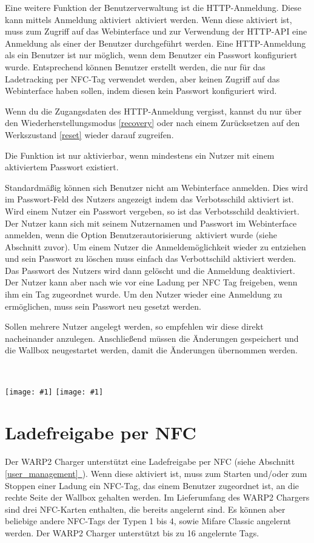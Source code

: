 \documentclass[a4paper,10pt]{article}
\newcommand{\hint}[1]{\begin{tcolorbox}[colback=boxgray,colframe=black,coltext=
white,title=Hinweis,left*=2mm,right*=2mm,boxsep=1mm,bottom=1mm,top=1mm]#1\end{tcolorbox}}
\newcommand{\gfx}[1]{\texttt{[image: \#1]}}
\newcommand*{\fullref}[1]{\hyperref[{#1}]{\ref*{#1}~\nameref*{#1}}}
\begin{document}
\begin{multicols*}{2}
	Eine weitere Funktion der Benutzerverwaltung ist die HTTP-Anmeldung. Diese
	kann mittels \glqq Anmeldung aktiviert\grqq~aktiviert werden. Wenn diese aktiviert ist, muss zum Zugriff auf das Webinterface und zur Verwendung
	der HTTP-API eine Anmeldung als einer der Benutzer durchgeführt werden. Eine HTTP-Anmeldung als ein Benutzer ist nur möglich, wenn
	dem Benutzer ein Passwort konfiguriert wurde. Entsprechend können Benutzer erstellt werden, die nur für das Ladetracking per NFC-Tag
	verwendet werden, aber keinen Zugriff auf das Webinterface haben sollen, indem diesen kein Passwort konfiguriert wird.
	\hint{Wenn du die Zugangsdaten des HTTP-Anmeldung vergisst, kannst du nur über den Wiederherstellungsmodus \ref{recovery} oder nach einem Zurücksetzen auf den Werkszustand \ref{reset} wieder darauf zugreifen.}
	Die Funktion ist nur aktivierbar, wenn mindestens ein Nutzer mit einem
	aktiviertem Passwort existiert.

	Standardmäßig können sich Benutzer nicht am Webinterface anmelden. Dies wird
	im Passwort-Feld des Nutzers angezeigt indem das Verbotsschild aktiviert
	ist. Wird einem Nutzer ein Passwort vergeben, so ist das Verbotsschild
	deaktiviert. Der Nutzer kann sich mit seinem Nutzernamen und Passwort im
	Webinterface anmelden, wenn die Option \glqq
	Benutzerautorisierung\grqq~aktiviert wurde (siehe Abschnitt zuvor).
	Um einem Nutzer die Anmeldemöglichkeit wieder zu entziehen und sein Passwort
	zu löschen muss einfach das Verbottschild aktiviert werden. Das Passwort des
	Nutzers wird dann gelöscht und die Anmeldung deaktiviert. Der Nutzer kann
	aber nach wie vor eine Ladung per NFC Tag freigeben, wenn ihm ein Tag
	zugeordnet wurde. Um den Nutzer wieder eine Anmeldung zu ermöglichen, muss
	sein Passwort neu gesetzt werden.

	Sollen mehrere Nutzer angelegt werden, so empfehlen wir diese direkt
	nacheinander anzulegen. Anschließend müssen die Änderungen gespeichert und
	die Wallbox neugestartet werden, damit die Änderungen übernommen werden.

	\vfill
	\
	\columnbreak

	\gfx{./img_warp2/resized/web_users}
	\vfill
	\gfx{./img_warp2/resized/web_users_new}

	\newpage
	\section{Ladefreigabe per NFC}
	\label{NFC}
	Der WARP2 Charger unterstützt eine Ladefreigabe per NFC (siehe Abschnitt
	\fullref{user_management}). Wenn diese aktiviert ist,
	muss zum Starten und/oder zum Stoppen einer Ladung ein NFC-Tag, das einem Benutzer zugeordnet ist, an die rechte Seite
	der Wallbox gehalten werden. Im Lieferumfang des WARP2 Chargers sind drei NFC-Karten enthalten,
	die bereits angelernt sind. Es können aber beliebige andere NFC-Tags der Typen 1 bis 4,
	sowie Mifare Classic angelernt werden. Der WARP2 Charger unterstützt bis zu 16 angelernte Tags.


\end{multicols*}
\end{document}
